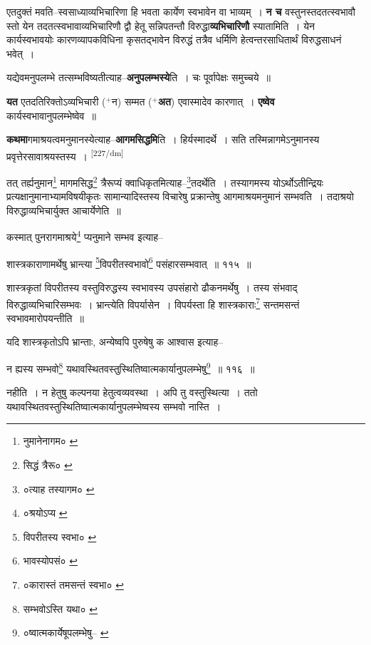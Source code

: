 \documentclass[article,12pt,a4paper]{memoir}
\newcommand{\add}[1]{($^{+}$#1)}
\begin{document}
	  \pstart एतदुक्तं मवति--स्वसाध्याव्यभिचारिणा हि भवता कार्येण स्वभावेन वा भाव्यम् । \textbf{न च} वस्तुनस्तदतत्स्वभावौ स्तो येन तदतत्स्वभावाव्यभिचारिणौ द्वौ हेतू सन्निपतन्तौ विरुद्धा\textbf{व्यभिचारिणौ} स्यातामिति । येन कार्यस्वभावयोः कारणव्यापकविधिना कृसतद्भावेन विरुद्धं तत्रैव धर्मिणि हेत्वन्तरसाधितार्थं विरुद्धसाधनं भवेत् ।
	\pend
      

	  \pstart यद्येवमनुपलम्भे तत्सम्भविष्यतीत्याह--\textbf{अनुपलम्भस्ये}ति । चः पूर्वापेक्षः समुच्चये ॥
	\pend
      

	  \pstart \textbf{यत} एतदतिरिक्तोऽव्यभिचारी \add{न} सम्मत \add{\textbf{अत}} एवास्मादेव कारणात् । \textbf{एष्वेव} कार्यस्वभावानुपलम्भेष्वेव ॥
	\pend
      

	  \pstart \textbf{कथमा}गमाश्रयत्वमनुमानस्येत्याह--\textbf{आगमसिद्धमि}ति । हिर्यस्मादर्थे । सति तस्मिन्नागमेऽनुमानस्य प्रवृत्तेरसावाश्रयस्तस्य ।
	\pend
      \leavevmode\textsuperscript{\rmlatinfont\tiny [227/dm]}

	  \pstart तत् तर्ह्यनुमान\footnote{नुमानेनागम० \cite{dp-msA} \cite{dp-msB} \cite{dp-edP} \cite{dp-edH}} मागमसिद्ध\footnote{सिद्धं त्रैरू० \cite{dp-msC}} त्रैरूप्यं क्वाधिकृतमित्याह--\footnote{०त्याह तस्यागम० \cite{dp-msB}}तदर्थेति । तस्यागमस्य योऽर्थोऽतीन्द्रियः प्रत्यक्षानुमानाभ्यामविषयीकृतः सामान्यादिस्तस्य विचारेषु प्रक्रान्तेषु आगमाश्रयमनुमानं सम्भवति । तदाश्रयो विरुद्धाव्यभिचार्युक्त आचार्येणेति ॥
	\pend
       

	  \pstart कस्मात् पुनरागमाश्रये\footnote{०श्रयोऽप्य \cite{dp-msA}} प्यनुमाने सम्भव इत्याह--
	\pend
       

	  \pstart शास्त्रकाराणामर्थेषु भ्रान्त्या \footnote{विपरीतस्य स्वभा० \cite{dp-msB} \cite{dp-edP} \cite{dp-edH} \cite{dp-edE}}विपरीतस्वभावो\footnote{भावस्योपसं० \cite{dp-edN}} पसंहारसम्भवात् ॥ ११५ ॥
	\pend
       

	  \pstart शास्त्रकृतां विपरीतस्य वस्तुविरुद्धस्य स्वभावस्य उपसंहारो ढौकनमर्थेषु । तस्य संभवाद् विरुद्धाव्यभिचारिसम्भवः । भ्रान्त्येति विपर्यासेन । विपर्यस्ता हि शास्त्रकाराः\footnote{०कारास्तं तमसन्तं स्वभा० \cite{dp-edE}} सन्तमसन्तं स्वभावमारोपयन्तीति ॥
	\pend
       

	  \pstart यदि शास्त्रकृतोऽपि भ्रान्ताः, अन्येष्वपि पुरुषेषु क आश्वास इत्याह--
	\pend
       

	  \pstart न ह्यस्य सम्भवो\footnote{सम्भवोऽस्ति यथा० \cite{dp-msC}} यथावस्थितवस्तुस्थितिष्वात्मकार्यानुपलम्भेषु\footnote{०ष्वात्मकार्येषूपलम्भेषु--\cite{dp-msB} \cite{dp-edP} \cite{dp-edH}} ॥ ११६ ॥
	\pend
       

	  \pstart नहीति । न हेतुषु कल्पनया हेतुत्वव्यवस्था । अपि तु वस्तुस्थित्या । ततो यथावस्थितवस्तुस्थितिष्वात्मकार्यानुपलम्भेष्वस्य सम्भवो नास्ति ।
	\pend
       
\end{document}
